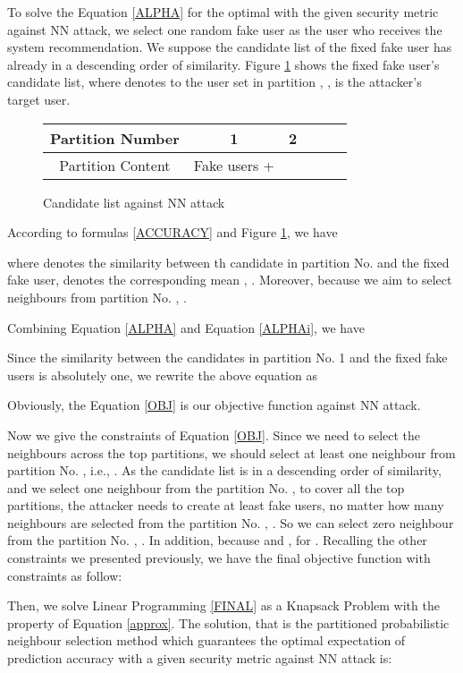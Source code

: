 \documentclass[11pt]{article}
\begin{document}
To solve the Equation \eqref{ALPHA} for the optimal  with the given security metric  against NN attack, we select one random fake user as the user who receives the system recommendation. We suppose the candidate list of the fixed fake user has already in a descending order of similarity. Figure \ref{fig:1kNN} shows the fixed fake user's candidate list, where  denotes to the user set in partition , ,  is the attacker's target user.
\begin{figure}[!h]
\centering
\begin{tabular}{|c|c|c|c|c|c|}
\hline 
Partition Number & 1 & 2 &  &  & \tabularnewline
\hline 
Partition Content & Fake users +  &  &  &  & \tabularnewline
\hline 
\end{tabular}
\caption{Candidate list against NN attack}
\label{fig:1kNN}
\end{figure}

According to formulas \eqref{ACCURACY} and Figure \ref{fig:1kNN}, we have

where  denotes the similarity between th candidate in partition No.  and the fixed fake user,  denotes the corresponding mean , . Moreover, because we aim to select  neighbours from partition No. , .

Combining Equation \eqref{ALPHA} and Equation \eqref{ALPHAi}, we have 

Since the similarity between the candidates in partition No. 1 and the fixed fake users is absolutely one, we rewrite the above equation as

Obviously, the Equation \eqref{OBJ} is our objective function against NN attack.

Now we give the constraints of Equation \eqref{OBJ}. Since we need to select the  neighbours across the top  partitions, we should select at least one neighbour from partition No. , i.e., . As the candidate list is in a descending order of similarity, and we select one neighbour from the partition No. , to cover all the top  partitions, the attacker needs to create at least  fake users, no matter how many neighbours are selected from the partition No. , . So we can select zero neighbour from the partition No. , . In addition, because  and ,  for . Recalling the other constraints we presented previously, we have the final objective function with constraints as follow:


Then, we solve Linear Programming \eqref{FINAL} as a Knapsack Problem with the property of Equation \eqref{approx}. The solution, that is the partitioned probabilistic neighbour selection method which guarantees the optimal expectation of prediction accuracy  with a given security metric  against NN attack is:
\end{document}
